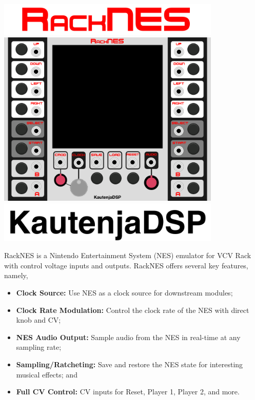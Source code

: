 \documentclass[12pt,a4paper]{article}
\begin{document}
\thispagestyle{empty}
\vspace*{\fill}
\begin{center}
\includegraphics[width=0.8\textwidth]{RackNES-Logo}
\linebreak\linebreak\linebreak\linebreak
\includegraphics[width=0.8\textwidth]{RackNES-Module}
\linebreak\linebreak\linebreak\linebreak
\includegraphics[width=0.8\textwidth]{KautenjaDSP}
\end{center}
\vspace*{\fill}
\clearpage


RackNES is a Nintendo Entertainment System (NES) emulator for VCV Rack with
control voltage inputs and outputs. RackNES offers several key features, namely,

\begin{itemize}
  \item \textbf{Clock Source:} Use NES as a clock source for downstream modules;
  \item \textbf{Clock Rate Modulation:} Control the clock rate of the NES with direct knob and CV;
  \item \textbf{NES Audio Output:} Sample audio from the NES in real-time at any sampling rate;
  \item \textbf{Sampling/Ratcheting:} Save and restore the NES state for interesting musical effects; and
  \item \textbf{Full CV Control:} CV inputs for Reset, Player 1, Player 2, and more.
\end{itemize}
\end{document}
